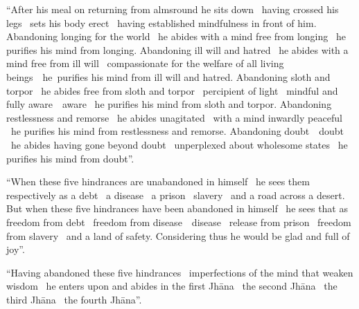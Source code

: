 \begin{english-only-justify}
  ``After his meal on returning from almsround he sits down \breathmark\ having crossed his legs \breathmark\ sets his body erect \breathmark\ having established mindfulness in front of him. Abandoning longing\ifdigitalversion\makeatletter\hyperlink{endnote61-appendix}\makeatother\thinspace\fi
  for the world \breathmark\ he abides with a mind free from longing \breathmark\ he purifies his mind from longing. Abandoning ill will and hatred \breathmark\ he abides with a mind free from ill will \breathmark\ compassionate for the welfare of all living \mbox{beings}~\breathmark\ he~purifies his mind from ill will and hatred. Abandoning sloth and torpor \breathmark\ he abides free from sloth and torpor \breathmark\ percipient of light \breathmark\ mindful and fully \ifbfiveversion \mbox{aware}~\breathmark\ \else aware \breathmark\ \fi he purifies his mind from sloth and torpor. Abandoning restlessness and remorse \breathmark\ he abides unagitated \breathmark\ with a mind inwardly peaceful \breathmark\ he purifies his mind from restlessness and remorse. Abandoning \ifbfiveversion \mbox{doubt}~\breathmark\ \else doubt \breathmark\ \fi he abides having gone beyond doubt \breathmark\ unperplexed about wholesome states \breathmark\ he purifies his mind from doubt''.
\end{english-only-justify}

\suttaRef{[MN 107]}

\begin{english-only-justify}
  ``When these five hindrances are unabandoned in himself \breathmark\ he sees them respectively as a debt \breathmark\ a disease \breathmark\ a prison \breathmark\ slavery \breathmark\ and a road across a desert. But when these five hindrances have been abandoned in himself \breathmark\ he sees that as freedom from debt \breathmark\ freedom from \ifbfiveversion \mbox{disease}~\breathmark\ \else disease \breathmark\ \fi release from prison \breathmark\ freedom from slavery \breathmark\ and a land of safety. Considering thus he would be glad and full of joy''.
\end{english-only-justify}

\begin{english-only-justify}
  ``Having abandoned these five hindrances \breathmark\ imperfections of the mind that weaken wisdom \breathmark\ he enters upon and abides in the first Jhāna \breathmark\ the second Jhāna \breathmark\ the third Jhāna \breathmark\ the fourth Jhāna''.
\end{english-only-justify}

